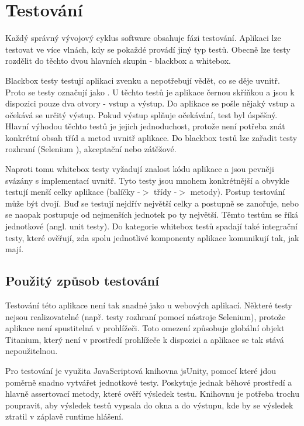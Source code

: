 \chapter{Testování}

Každý správný vývojový cyklus software obsahuje fázi testování\cite{zivotnicyklus}. Aplikaci lze testovat ve více vlnách, kdy se pokaždé provádí jiný typ testů. Obecně lze testy rozdělit do těchto dvou hlavních skupin - blackbox a whitebox.

Blackbox testy testují aplikaci zvenku a nepotřebují vědět, co se děje uvnitř. Proto se testy označují jako . U těchto testů je aplikace černou skříňkou a jsou k dispozici pouze dva otvory - vstup a výstup. Do aplikace se pošle nějaký vstup a očekává se určitý výstup. Pokud výstup splňuje očekávání, test byl úspěšný. Hlavní výhodou těchto testů je jejich jednoduchost, protože není potřeba znát konkrétní obsah tříd a metod uvnitř aplikace. Do blackbox testů lze zařadit testy rozhraní (Selenium \cite{selenium}), akceptační nebo zátěžové.

Naproti tomu whitebox testy vyžadují znalost kódu aplikace a jsou pevněji svázány s implementací uvnitř. Tyto testy jsou mnohem konkrétnější a obvykle testují menší celky aplikace (balíčky -$>$ třídy -$>$ metody). Postup testování může být dvojí. Buď se testují nejdřív největší celky a postupně se zanořuje, nebo se naopak postupuje od nejmenších jednotek po ty největší. Těmto testům se říká jednotkové (angl. unit testy). Do kategorie whitebox testů spadají také integrační testy, které ověřují, zda spolu jednotlivé komponenty aplikace komunikují tak, jak mají.

\section{Použitý způsob testování}

Testování této aplikace není tak snadné jako u webových aplikací. Některé testy nejsou realizovatelné (např. testy rozhraní pomocí nástroje Selenium), protože aplikace není spustitelná v prohlížeči. Toto omezení způsobuje globální objekt Titanium, který není v prostředí prohlížeče k dispozici a aplikace se tak stává nepoužitelnou.

Pro testování je využita JavaScriptová knihovna jsUnity\cite{jsunity}, pomocí které jdou poměrně snadno vytvářet jednotkové testy. Poskytuje jednak běhové prostředí a hlavně assertovací metody, které ověří výsledek testu. Knihovnu je potřeba trochu poupravit, aby výsledek testů vypsala do okna a do výstupu, kde by se výsledek ztratil v záplavě runtime hlášení.

